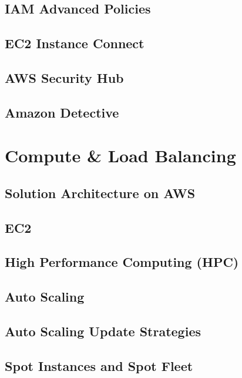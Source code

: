 \documentclass[11pt]{book}
\begin{document}
    \section{IAM Advanced Policies}


    \section{EC2 Instance Connect}


    \section{AWS Security Hub}


    \section{Amazon Detective}


    \chapter{Compute \& Load Balancing}


    \section{Solution Architecture on AWS}


    \section{EC2}


    \section{High Performance Computing (HPC)}


    \section{Auto Scaling}


    \section{Auto Scaling Update Strategies}


    \section{Spot Instances and Spot Fleet}
\end{document}
